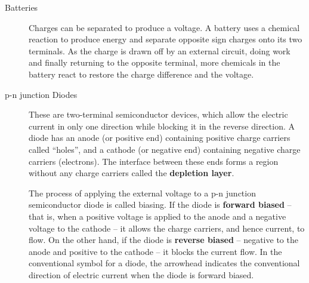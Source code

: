 \begin{refsection}
\begin{description}
\item[Batteries]

Charges can be separated to produce a voltage. A battery uses a chemical reaction to produce energy and separate opposite sign charges onto its two terminals. As the charge is drawn off by an external circuit, doing work and finally returning to the opposite terminal, more chemicals in the battery react to restore the charge difference and the voltage.


\item[p-n junction Diodes]

These are two-terminal semiconductor devices, which allow the electric current in only one direction while blocking it in the reverse direction. A diode has an anode (or positive end) containing positive charge carriers called ``holes'', and a cathode (or negative end) containing negative charge carriers (electrons). The interface between these ends forms a region without any charge carriers called the \textbf{depletion layer}. 

The process of applying the external voltage to a p-n junction semiconductor diode is called biasing. If the diode is \textbf{forward biased} -- that is, when a positive voltage is applied to the anode and a negative voltage to the cathode -- it allows the charge carriers, and hence current, to flow. On the other hand, if the diode is \textbf{reverse biased} -- negative to the anode and positive to the cathode -- it blocks the current flow. In the conventional symbol for a diode, the arrowhead indicates the conventional direction of electric current when the diode is forward biased.


\end{description}
\end{refsection}
